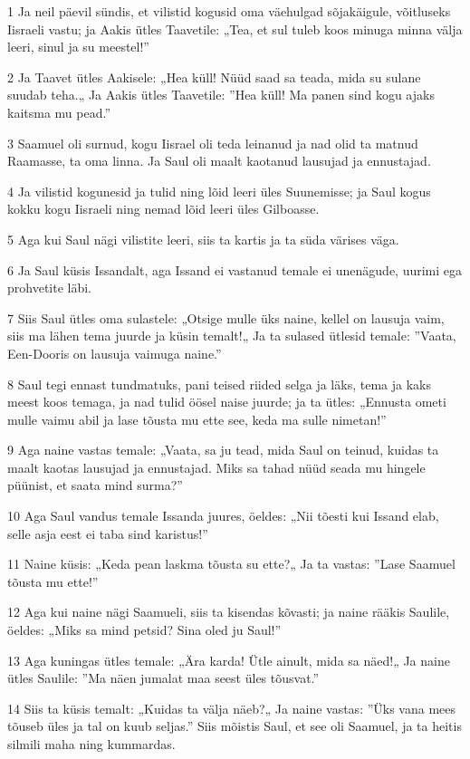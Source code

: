 \par 1 Ja neil päevil sündis, et vilistid kogusid oma väehulgad sõjakäigule, võitluseks Iisraeli vastu; ja Aakis ütles Taavetile: „Tea, et sul tuleb koos minuga minna välja leeri, sinul ja su meestel!”
\par 2 Ja Taavet ütles Aakisele: „Hea küll! Nüüd saad sa teada, mida su sulane suudab teha.„ Ja Aakis ütles Taavetile: ”Hea küll! Ma panen sind kogu ajaks kaitsma mu pead.”
\par 3 Saamuel oli surnud, kogu Iisrael oli teda leinanud ja nad olid ta matnud Raamasse, ta oma linna. Ja Saul oli maalt kaotanud lausujad ja ennustajad.
\par 4 Ja vilistid kogunesid ja tulid ning lõid leeri üles Suunemisse; ja Saul kogus kokku kogu Iisraeli ning nemad lõid leeri üles Gilboasse.
\par 5 Aga kui Saul nägi vilistite leeri, siis ta kartis ja ta süda värises väga.
\par 6 Ja Saul küsis Issandalt, aga Issand ei vastanud temale ei unenägude, uurimi ega prohvetite läbi.
\par 7 Siis Saul ütles oma sulastele: „Otsige mulle üks naine, kellel on lausuja vaim, siis ma lähen tema juurde ja küsin temalt!„ Ja ta sulased ütlesid temale: ”Vaata, Een-Dooris on lausuja vaimuga naine.”
\par 8 Saul tegi ennast tundmatuks, pani teised riided selga ja läks, tema ja kaks meest koos temaga, ja nad tulid öösel naise juurde; ja ta ütles: „Ennusta ometi mulle vaimu abil ja lase tõusta mu ette see, keda ma sulle nimetan!”
\par 9 Aga naine vastas temale: „Vaata, sa ju tead, mida Saul on teinud, kuidas ta maalt kaotas lausujad ja ennustajad. Miks sa tahad nüüd seada mu hingele püünist, et saata mind surma?”
\par 10 Aga Saul vandus temale Issanda juures, öeldes: „Nii tõesti kui Issand elab, selle asja eest ei taba sind karistus!”
\par 11 Naine küsis: „Keda pean laskma tõusta su ette?„ Ja ta vastas: ”Lase Saamuel tõusta mu ette!”
\par 12 Aga kui naine nägi Saamueli, siis ta kisendas kõvasti; ja naine rääkis Saulile, öeldes: „Miks sa mind petsid? Sina oled ju Saul!”
\par 13 Aga kuningas ütles temale: „Ära karda! Ütle ainult, mida sa näed!„ Ja naine ütles Saulile: ”Ma näen jumalat maa seest üles tõusvat.”
\par 14 Siis ta küsis temalt: „Kuidas ta välja näeb?„ Ja naine vastas: ”Üks vana mees tõuseb üles ja tal on kuub seljas.” Siis mõistis Saul, et see oli Saamuel, ja ta heitis silmili maha ning kummardas.
